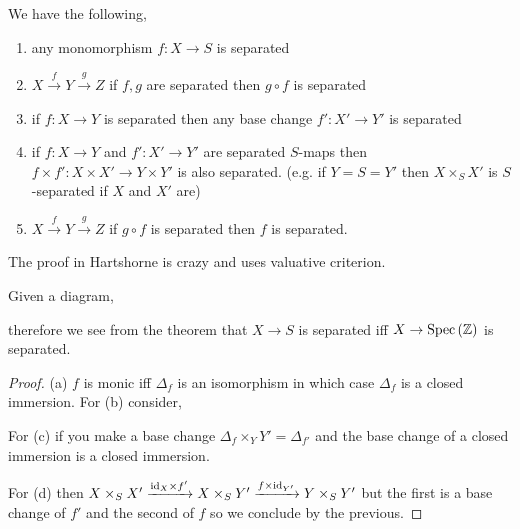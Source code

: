 \documentclass[12pt]{article}
\begin{document}
\begin{thm}
We have the following,
\begin{enumerate}
\item any monomorphism $f : X \to S$ is separated
\item $X \xrightarrow{f} Y \xrightarrow{g} Z$ if $f, g$ are separated then $g \circ f$ is separated
\item if $f : X \to Y$ is separated then any base change $f' : X' \to Y'$ is separated
\item if $f : X \to Y$ and $f' : X' \to Y'$ are separated $S$-maps then $f \times f' : X \times X' \to Y \times Y'$ is also separated. (e.g. if $Y = S = Y'$ then $X \times_S X'$ is $S$-separated if $X$ and $X'$ are)
\item $X \xrightarrow{f} Y \xrightarrow{g} Z$ if $g \circ f$ is separated then $f$ is separated.
\end{enumerate}
\end{thm}

\begin{rmk}
The proof in Hartshorne is crazy and uses valuative criterion.
\end{rmk}

\begin{rmk}
Given a diagram,
\begin{center}
\end{center}
therefore we see from the theorem that $X \to S$ is separated iff $X \to \mathrm{Spec}\left( \mathbb{Z} \right)$ is separated.
\end{rmk}

\begin{proof}
(a) $f$ is monic iff $\Delta_f$ is an isomorphism in which case $\Delta_f$ is a closed immersion. For (b) consider,
\begin{center}
\end{center}

For (c) if you make a base change $\Delta_f \times_Y Y' = \Delta_{f'}$ and the base change of a closed immersion is a closed immersion.

For (d) then $X \times_S X' \xrightarrow{\mathrm{id}_X \times f'} X \times_S Y' \xrightarrow{f \times \mathrm{id}_{Y'}} Y \times_S Y'$ but the first is a base change of $f'$ and the second of $f$ so we conclude by the previous. 
\end{proof}
\end{document}
